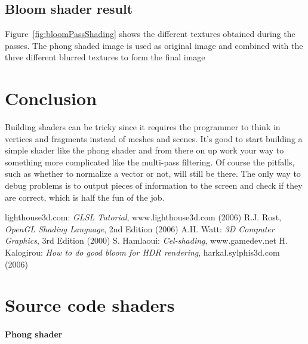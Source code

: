 \documentclass[a4paper,12pt]{article}
\begin{document}
\subsection{Bloom shader result}
\label{sec:bloomShaderResult}
Figure~\ref{fig:bloomPassShading} shows the different textures obtained during the passes. The phong shaded image is used as original image and combined with the three different blurred textures to form the final image

\section{Conclusion}
\label{sec:Conclusion}
Building shaders can be tricky since it requires the programmer to think in vertices and fragments instead of meshes and scenes. It's good to start building a simple shader like the phong shader and from there on up work your way to something more complicated like the multi-pass filtering. Of course the pitfalls, such as whether to normalize a vector or not, will still be there. The only way to debug problems is to output pieces of information to the screen and check if they are correct, which is half the fun of the job.

\begin{thebibliography}{99}
	 lighthouse3d.com: \emph{GLSL Tutorial}, www.lighthouse3d.com (2006)
	 R.J. Rost, \emph{OpenGL Shading Language}, 2nd Edition (2006)
	 A.H. Watt: \emph{3D Computer Graphics}, 3rd Edition (2000)
	 S. Hamlaoui: \emph{Cel-shading}, www.gamedev.net
	 H. Kalogirou: \emph{How to do good bloom for HDR rendering}, harkal.sylphis3d.com (2006)
\end{thebibliography}

\pagebreak[4]

\section{Source code shaders}
\label{sec:SourceCodeShaders}

\paragraph{Phong shader}
\label{sec:PhongShaderSource}
\end{document}
